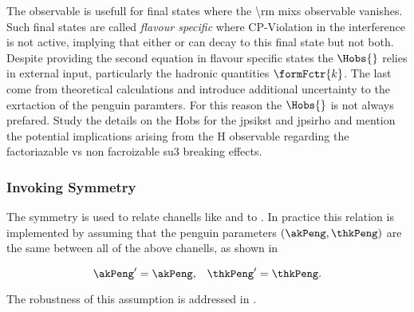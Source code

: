 The observable is usefull for final states where the \Acp{\rm mix} observable vanishes. Such final states are called {\it flavour specific}
where CP-Violation in the interference is not active, implying that either \Bs or \Bsb can decay to this final state but not both.
Despite providing the second equation in flavour specific states the $\Hobs{}$ relies in external input, particularly the hadronic quantities $\formFctr{k}$.
The last come from theoretical calculations and introduce additional uncertainty to the exrtaction of the penguin paramters.
For this reason the $\Hobs{}$ is not always prefared.
{\color{red} Study the details on the Hobs for the jpsikst and jpsirho and mention the potential implications arising from the H observable
 regarding the factoriazable vs non facroizable su3 breaking effects}.


\subsubsection{Invoking \grpsuthree Symmetry}
The \grpsuthree symmetry is used to relate chanells like \BsJpsiKst and \BsJpsiRho to \BsJpsiPhi.
In practice this relation is implemented by assuming that the penguin parameters $(\akPeng,\thkPeng)$
are the same between all of the above chanells, as shown in 

\begin{equation}
\centering
\akPeng' = \akPeng, \;\;\; \thkPeng' = \thkPeng .
\label{invoke_su3}
\end{equation}

\noindent The robustness of this assumption is addressed in .
